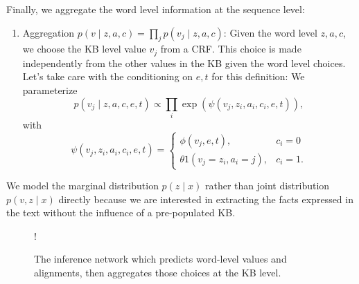 \documentclass[12pt]{article}
\begin{document}
Finally, we aggregate the word level information at the sequence level:
\begin{enumerate}
\item Aggregation $p(v \mid z,a,c) = \prod_j p(v_j \mid z,a,c)$:
    Given the word level $z,a,c$,
    we choose the KB level value $v_j$ from a CRF.
    This choice is made independently from the other values in the KB
    given the word level choices.
    Let's take care with the conditioning on $e,t$ for this definition:
    We parameterize
    $$p(v_j \mid z,a,c,e,t) \propto \prod_i \exp(\psi(v_j, z_i, a_i, c_i,e,t)),$$
    with
    $$
    \psi(v_j, z_i, a_i, c_i,e,t) = \begin{cases}
    \phi(v_j,e,t), & c_i = 0 \\
    \theta 1(v_j = z_i, a_i = j), & c_i = 1.
    \end{cases}
    $$
\end{enumerate}

We model the marginal distribution $p(z \mid x)$ rather than
joint distribution $p(v,z\mid x)$ directly because we are interested in 
extracting the facts expressed in the text without the influence of a pre-populated KB.

\begin{figure}[t]
\begin{center}
\resizebox {.3\columnwidth} {!} {
} %
\end{center}
\caption{The inference network which predicts word-level values and alignments,
then aggregates those choices at the KB level.
}
\label{fig:infmodel}
\end{figure}
\end{document}
